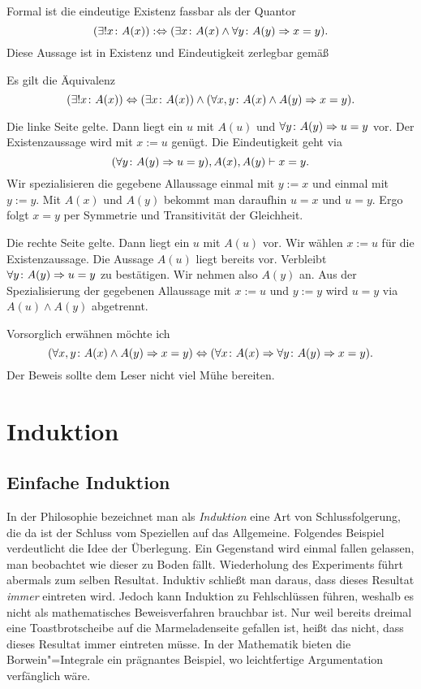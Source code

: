 Formal ist die eindeutige Existenz fassbar als der Quantor
\[(\exists! x\colon A(x)):\Leftrightarrow
(\exists x\colon A(x)\land\forall y\colon A(y)\Rightarrow x=y).\]
Diese Aussage ist in Existenz und Eindeutigkeit zerlegbar gemäß
\begin{Satz}\label{eindeutige-Existenz-separat}
Es gilt die Äquivalenz
\[(\exists! x\colon A(x))\Leftrightarrow
(\exists x\colon A(x))\land(\forall x,y\colon A(x)\land A(y)\Rightarrow x=y).\]
\end{Satz}
\begin{Beweis}
Die linke Seite gelte. Dann liegt ein $u$ mit $A(u)$
und $\forall y\colon A(y)\Rightarrow u=y$ vor. Der Existenzaussage wird
mit $x:=u$ genügt. Die Eindeutigkeit geht via
\[(\forall y\colon A(y)\Rightarrow u=y), A(x), A(y)\vdash x=y.\]
Wir spezialisieren die gegebene Allaussage einmal mit $y:=x$ und einmal
mit $y:=y$. Mit $A(x)$ und $A(y)$ bekommt man daraufhin $u=x$ und $u=y$. Ergo
folgt $x=y$ per Symmetrie und Transitivität der Gleichheit.

Die rechte Seite gelte. Dann liegt ein $u$ mit $A(u)$ vor. Wir wählen
$x:=u$ für die Existenzaussage. Die Aussage $A(u)$ liegt bereits vor.
Verbleibt $\forall y\colon A(y)\Rightarrow u=y$ zu bestätigen. Wir nehmen
also $A(y)$ an. Aus der Spezialisierung der gegebenen Allaussage mit
$x:=u$ und $y:=y$ wird $u=y$ via $A(u)\land A(y)$ abgetrennt.\,\qedsymbol
\end{Beweis}

\noindent
Vorsorglich erwähnen möchte ich
\[(\forall x,y\colon A(x)\land A(y)\Rightarrow x=y)\Leftrightarrow
(\forall x\colon A(x)\Rightarrow\forall y\colon A(y)\Rightarrow x = y).\]
Der Beweis sollte dem Leser nicht viel Mühe bereiten.

\newpage
\section{Induktion}

\subsection{Einfache Induktion}

In der Philosophie bezeichnet man als \emph{Induktion} eine Art von
Schlussfolgerung, die da ist der Schluss vom Speziellen auf das
Allgemeine. Folgendes Beispiel verdeutlicht die Idee der Überlegung. Ein
Gegenstand wird einmal fallen gelassen, man beobachtet wie dieser zu
Boden fällt. Wiederholung des Experiments führt abermals zum selben
Resultat. Induktiv schließt man daraus, dass dieses Resultat \emph{immer}
eintreten wird. Jedoch kann Induktion zu Fehlschlüssen führen, weshalb
es nicht als mathematisches Beweisverfahren brauchbar ist. Nur weil
bereits dreimal eine Toastbrotscheibe auf die Marmeladenseite gefallen
ist, heißt das nicht, dass dieses Resultat immer eintreten müsse. In der
Mathematik bieten die Borwein"=Integrale ein prägnantes Beispiel, wo
leichtfertige Argumentation verfänglich wäre.

